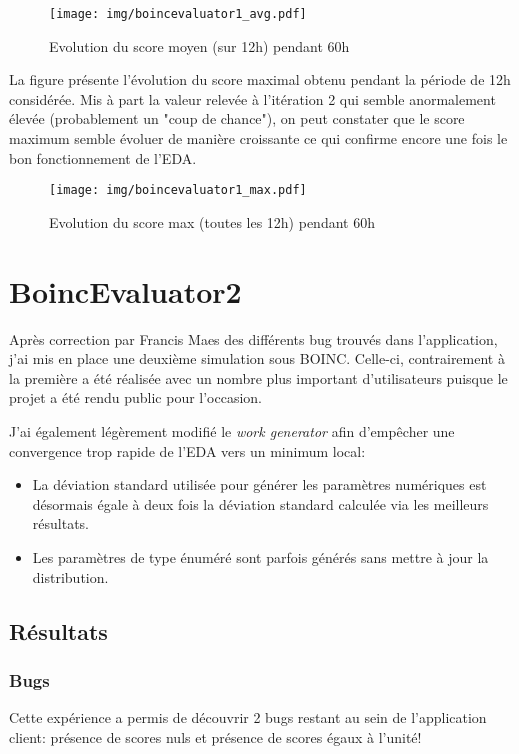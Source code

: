 \documentclass[a4paper, 11pt]{article}
\begin{document}
\begin{figure}[!h]
\centering
\texttt{[image: img/boincevaluator1\_avg.pdf]}
\caption{Evolution du score moyen (sur 12h) pendant 60h}%
\label{boincevaluator1_avg}
\end{figure}

La figure %
présente l'évolution du score maximal obtenu pendant la période de 12h considérée. Mis à part la valeur relevée à l'itération 2 %
qui semble anormalement élevée (probablement un "coup de chance"), on peut constater que le score maximum semble évoluer de manière croissante ce qui confirme encore une fois le bon fonctionnement de l'EDA.
\begin{figure}[!h]
\centering
\texttt{[image: img/boincevaluator1\_max.pdf]}
\caption{Evolution du score max (toutes les 12h) pendant 60h}%
\label{boincevaluator1_avg}
\end{figure}




\section{BoincEvaluator2}
Après correction par Francis Maes des différents bug trouvés dans l'application, j'ai mis en place une deuxième simulation sous \textsc{BOINC}. Celle-ci, contrairement à la première a été réalisée avec un nombre plus important d'utilisateurs puisque le projet a été rendu public pour l'occasion.

J'ai également légèrement modifié le \textit{work generator} afin d'empêcher une convergence trop rapide de l'EDA vers un minimum local:
\begin{itemize}
\item La déviation standard utilisée pour générer les paramètres numériques est désormais égale à deux fois la déviation standard calculée via les meilleurs résultats.
\item Les paramètres de type énuméré sont parfois générés sans mettre à jour la distribution. %
\end{itemize}

\subsection{Résultats}

\subsubsection{Bugs}
Cette expérience a permis de découvrir 2 bugs restant au sein de l'application client: présence de scores nuls et présence de scores égaux à l'unité!
\end{document}

